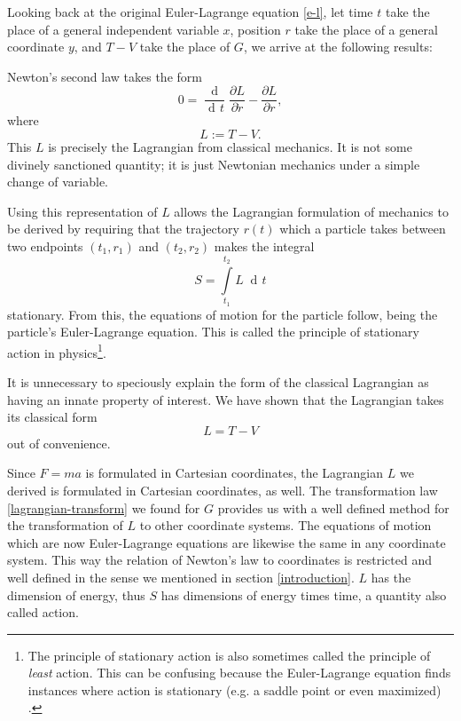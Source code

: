 \documentclass[prb,preprint]{revtex4-1}
\DeclareMathOperator{\dd}{d\!}
\DeclareMathOperator{\ddd}{\mathrm{d}}
\begin{document}
Looking back at the original Euler-Lagrange equation \eqref{e-l}, let time $t$ take the place of a general independent variable $x$, position $r$ take the place of a general coordinate $y$, and $T-V$ take the place of $G$, we arrive at the following results:

Newton's second law takes the form
\begin{equation}
0 = \frac{\ddd}{\dd t} \frac{\partial L}{\partial \dot{r}} - \frac{\partial L}{\partial r},
\end{equation}
where
\begin{equation}
 L := T-V.
\end{equation}
This $L$ is precisely the Lagrangian from classical mechanics. It is not some divinely sanctioned quantity; it is just Newtonian mechanics under a simple change of variable.

Using this representation of $L$ allows the Lagrangian formulation of mechanics to be derived by requiring that the trajectory $r(t)$ which a particle takes between two endpoints $(t_1,r_1)$ and $(t_2,r_2)$ makes the integral
\begin{equation}\label{eqref:action}
S=\int\limits_{t_1}^{t_2} L \; \dd t
\end{equation}
stationary. From this, the equations of motion for the particle follow, being the particle's Euler-Lagrange equation. This is called the principle of stationary action in physics\footnote{The principle of stationary action is also sometimes called the principle of \emph{least} action. This can be confusing because the Euler-Lagrange equation finds instances where action is stationary (e.g. a saddle point or even maximized)  \cite{gray2007action}.}.

It is unnecessary to speciously explain the form of the classical Lagrangian as having an innate property of interest. We have shown that the Lagrangian takes its classical form
\begin{equation}
  L = T-V
\end{equation}
out of convenience.

Since $F=ma$ is formulated in Cartesian coordinates, the Lagrangian $L$ we derived is formulated in Cartesian coordinates, as well. The transformation law \eqref{lagrangian-transform} we found for $G$ provides us with a well defined method for the transformation of $L$ to other coordinate systems. The equations of motion which are now Euler-Lagrange equations are likewise the same in any coordinate system.  This way the relation of Newton's law to coordinates is restricted and well defined in the sense we mentioned in section \ref{introduction}. $L$ has the dimension of energy, thus $S$ has dimensions of energy times time, a quantity also called action.
\end{document}
